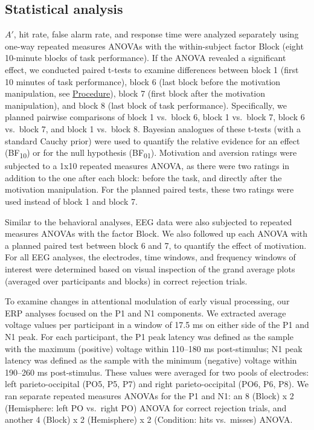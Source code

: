 \documentclass[11pt,english,]{memoir}
\begin{document}
\hypertarget{statistical-analysis}{%
\subsection{Statistical analysis}\label{statistical-analysis}}

\(A'\), hit rate, false alarm rate, and response time were analyzed separately using one-way repeated measures ANOVAs with the within-subject factor Block (eight 10-minute blocks of task performance). If the ANOVA revealed a significant effect, we conducted paired t-tests to examine differences between block 1 (first 10 minutes of task performance), block 6 (last block before the motivation manipulation, see \protect\hyperlink{procedure-1}{Procedure}), block 7 (first block after the motivation manipulation), and block 8 (last block of task performance). Specifically, we planned pairwise comparisons of block 1 vs.~block 6, block 1 vs.~block 7, block 6 vs.~block 7, and block 1 vs.~block 8. Bayesian analogues of these t-tests (with a standard Cauchy prior) \autocite{Rouder2009} were used to quantify the relative evidence for an effect (BF\textsubscript{10}) or for the null hypothesis (BF\textsubscript{01}). Motivation and aversion ratings were subjected to a 1x10 repeated measures ANOVA, as there were two ratings in addition to the one after each block: before the task, and directly after the motivation manipulation. For the planned paired tests, these two ratings were used instead of block 1 and block 7.

Similar to the behavioral analyses, EEG data were also subjected to repeated measures ANOVAs with the factor Block. We also followed up each ANOVA with a planned paired test between block 6 and 7, to quantify the effect of motivation. For all EEG analyses, the electrodes, time windows, and frequency windows of interest were determined based on visual inspection of the grand average plots (averaged over participants and blocks) in correct rejection trials.

To examine changes in attentional modulation of early visual processing, our ERP analyses focused on the P1 and N1 components. We extracted average voltage values per participant in a window of 17.5 ms on either side of the P1 and N1 peak. For each participant, the P1 peak latency was defined as the sample with the maximum (positive) voltage within 110--180 ms post-stimulus; N1 peak latency was defined as the sample with the minimum (negative) voltage within 190--260 ms post-stimulus. These values were averaged for two pools of electrodes: left parieto-occipital (PO5, P5, P7) and right parieto-occipital (PO6, P6, P8). We ran separate repeated measures ANOVAs for the P1 and N1: an 8 (Block) x 2 (Hemisphere: left PO vs.~right PO) ANOVA for correct rejection trials, and another 4 (Block) x 2 (Hemisphere) x 2 (Condition: hits vs.~misses) ANOVA.
\end{document}
